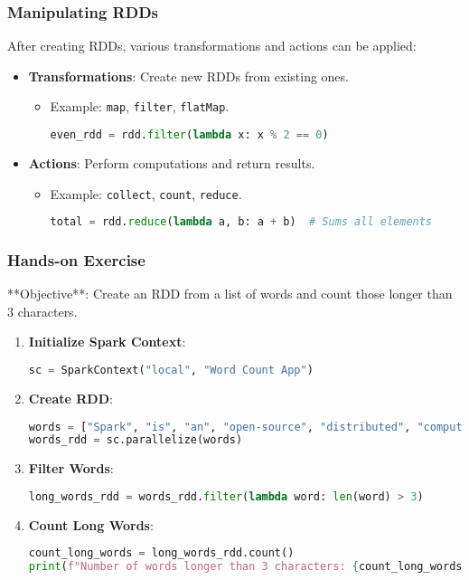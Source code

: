 \documentclass[aspectratio=169]{beamer}
\begin{document}
\begin{frame}[fragile]
    \frametitle{Manipulating RDDs}
    After creating RDDs, various transformations and actions can be applied:
    \begin{itemize}
        \item \textbf{Transformations}: Create new RDDs from existing ones.
        \begin{itemize}
            \item Example: \texttt{map}, \texttt{filter}, \texttt{flatMap}.
            \begin{lstlisting}[language=Python]
even_rdd = rdd.filter(lambda x: x % 2 == 0)
            \end{lstlisting}
        \end{itemize}
        
        \item \textbf{Actions}: Perform computations and return results.
        \begin{itemize}
            \item Example: \texttt{collect}, \texttt{count}, \texttt{reduce}.
            \begin{lstlisting}[language=Python]
total = rdd.reduce(lambda a, b: a + b)  # Sums all elements
            \end{lstlisting}
        \end{itemize}
    \end{itemize}
\end{frame}

\begin{frame}[fragile]
    \frametitle{Hands-on Exercise}
    **Objective**: Create an RDD from a list of words and count those longer than 3 characters.
    \begin{enumerate}
        \item \textbf{Initialize Spark Context}:
        \begin{lstlisting}[language=Python]
sc = SparkContext("local", "Word Count App")
        \end{lstlisting}

        \item \textbf{Create RDD}:
        \begin{lstlisting}[language=Python]
words = ["Spark", "is", "an", "open-source", "distributed", "computing", "system"]
words_rdd = sc.parallelize(words)
        \end{lstlisting}

        \item \textbf{Filter Words}:
        \begin{lstlisting}[language=Python]
long_words_rdd = words_rdd.filter(lambda word: len(word) > 3)
        \end{lstlisting}

        \item \textbf{Count Long Words}:
        \begin{lstlisting}[language=Python]
count_long_words = long_words_rdd.count()
print(f"Number of words longer than 3 characters: {count_long_words}")
        \end{lstlisting}
    \end{enumerate}
\end{frame}
\end{document}
